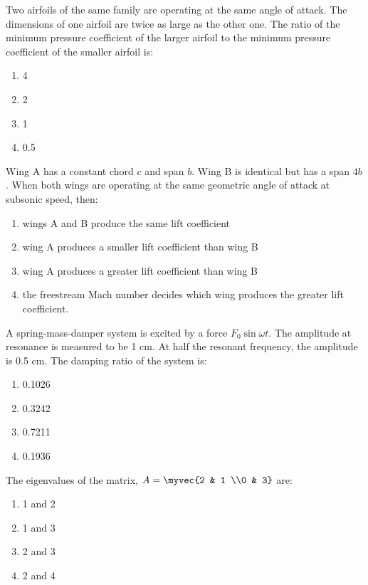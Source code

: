 \item  Two airfoils of the same family are operating at the same angle of attack. The dimensions of one airfoil are twice as large as the other one. The ratio of the minimum pressure coefficient of the larger airfoil to the minimum pressure coefficient of the smaller airfoil is: 
\begin{multicols}{4}
\begin{enumerate}
\item 4
\item 2
\item 1
\item 0.5
\end{enumerate}
\end{multicols}

\item  Wing A has a constant chord $c$ and span $b$. Wing B is identical but has a span $4b$. When both wings are operating at the same geometric angle of attack at subsonic speed, then:
\begin{enumerate}
\item wings A and B produce the same lift coefficient
\item wing A produces a smaller lift coefficient than wing B
\item wing A produces a greater lift coefficient than wing B
\item the freestream Mach number decides which wing produces the greater lift coefficient.
\end{enumerate}

\item  A spring-mass-damper system is excited by a force $F_0 \sin \omega t$. The amplitude at resonance is measured to be 1 cm. At half the resonant frequency, the amplitude is 0.5 cm. The damping ratio of the system is:
\begin{multicols}{4}
\begin{enumerate}
\item 0.1026
\item 0.3242
\item 0.7211
\item 0.1936
\end{enumerate}
\end{multicols}

\item  The eigenvalues of the matrix, 
$ A = \myvec{2 & 1 \\0 & 3}$
are:
\begin{multicols}{4}
\begin{enumerate}
\item 1 and 2
\item 1 and 3
\item 2 and 3
\item 2 and 4
\end{enumerate}
\end{multicols}

